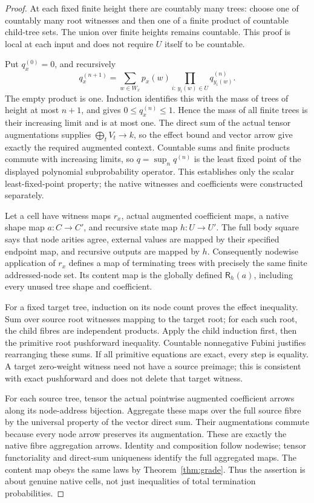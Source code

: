 \documentclass[11pt]{article}
\newcommand{\R}{\mathsf R}\newcommand{\Col}{\mathsf{Col}}\newcommand{\Vect}{\mathbf{Vect}_k}
\begin{document}
\begin{proof}
At each fixed finite height there are countably many trees: choose one of countably many root witnesses and then one of a finite product of countable child-tree sets. The union over finite heights remains countable. This proof is local at each input and does not require $U$ itself to be countable.

Put $q_x^{(0)}=0$, and recursively
\[
 q_x^{(n+1)}=\sum_{w\in W_x}p_x(w)
       \prod_{i:\,y_i(w)\in U}q_{y_i(w)}^{(n)}.
\]
The empty product is one. Induction identifies this with the mass of trees of height at most $n+1$, and gives $0\leq q_x^{(n)}\leq1$. Hence the mass of all finite trees is their increasing limit and is at most one. The direct sum of the actual tensor augmentations supplies $\bigoplus_tV_t\to k$, so the effect bound and vector arrow give exactly the required augmented context. Countable sums and finite products commute with increasing limits, so $q=\sup_nq^{(n)}$ is the least fixed point of the displayed polynomial subprobability operator. This establishes only the scalar least-fixed-point property; the native witnesses and coefficients were constructed separately.

Let a cell have witness maps $r_x$, actual augmented coefficient maps, a native shape map $a:C\to C'$, and recursive state map $h:U\to U'$. The full body square says that node arities agree, external values are mapped by their specified endpoint map, and recursive outputs are mapped by $h$. Consequently nodewise application of $r_x$ defines a map of terminating trees with precisely the same finite addressed-node set. Its content map is the globally defined $\R_h(a)$, including every unused tree shape and coefficient.

For a fixed target tree, induction on its node count proves the effect inequality. Sum over source root witnesses mapping to the target root; for each such root, the child fibres are independent products. Apply the child induction first, then the primitive root pushforward inequality. Countable nonnegative Fubini justifies rearranging these sums. If all primitive equations are exact, every step is equality. A target zero-weight witness need not have a source preimage; this is consistent with exact pushforward and does not delete that target witness.

For each source tree, tensor the actual pointwise augmented coefficient arrows along its node-address bijection. Aggregate these maps over the full source fibre by the universal property of the vector direct sum. Their augmentations commute because every node arrow preserves its augmentation. These are exactly the native fibre aggregation arrows. Identity and composition follow nodewise; tensor functoriality and direct-sum uniqueness identify the full aggregated maps. The content map obeys the same laws by Theorem~\ref{thm:grade}. Thus the assertion is about genuine native cells, not just inequalities of total termination probabilities.
\end{proof}
\end{document}
